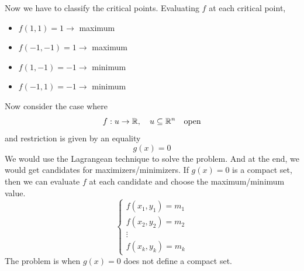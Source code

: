 {    Now we have to classify the critical points. Evaluating $f$ at each critical point,
    \begin{itemize}
        \item $f(1,1) = 1\rightarrow$ maximum
        \item $f(-1,-1) = 1\rightarrow$ maximum
        \item $f(1,-1) = -1\rightarrow$ minimum
        \item $f(-1,1) = -1\rightarrow$ minimum
    \end{itemize}
}
Now consider the case where
\begin{equation*}
    f: u\to\mathbb{R}, \quad u\subseteq\mathbb{R}^n\quad\text{open}
\end{equation*}
and restriction is given by an equality
\begin{equation*}
    g(x) = 0
\end{equation*}
We would use the Lagrangean technique to solve the problem. And at the end, we would get candidates for maximizers/minimizers.
If $g(x)=0$ is a compact set, then we can evaluate $f$ at each candidate and choose the maximum/minimum value.
\begin{equation*}
    \begin{cases*}
        f(x_1,y_1) = m_1\\
        f(x_2,y_2) = m_2\\
        \vdots\\
        f(x_k,y_k) = m_k
    \end{cases*}
\end{equation*}
The problem is when $g(x)=0$ does not define a compact set.


